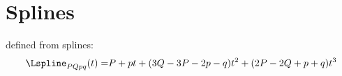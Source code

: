 \section{Splines}
    defined from splines:
    $$\begin{aligned}
        \Lspline_{PQpq}(t) =& P + pt + (3Q-3P-2p-q)t^2 + (2P-2Q+p+q)t^3 \\
    \end{aligned}$$
\newcommand\diff{{\rm d}}
